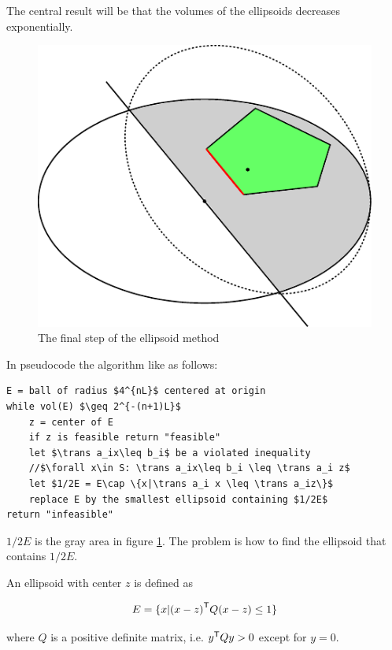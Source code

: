 The central result will be that the volumes of the ellipsoids decreases exponentially.

\begin{figure}[hbt]
\begin{center}
\includegraphics{./images/ellipsoid}
\end{center}
\caption{The final step of the ellipsoid method}
\label{Fig:ellipsoidMovement}
\end{figure}

In pseudocode the algorithm like as follows:

\begin{lstlisting}
E = ball of radius $4^{nL}$ centered at origin
while vol(E) $\geq 2^{-(n+1)L}$
	z = center of E
	if z is feasible return "feasible"
	let $\trans a_ix\leq b_i$ be a violated inequality
	//$\forall x\in S: \trans a_ix\leq b_i \leq \trans a_i z$
	let $1/2E = E\cap \{x|\trans a_i x \leq \trans a_iz\}$
	replace E by the smallest ellipsoid containing $1/2E$
return "infeasible"
\end{lstlisting}

$1/2E$ is the gray area in figure \ref{Fig:ellipsoidMovement}. The problem is how to find the ellipsoid that contains $1/2E$. 

\begin{Def}[Ellipsoid] An ellipsoid with center $z$ is defined as

\[E=\{x|{(x-z)}^\text{\upshape \sffamily T}Q(x-z)\leq 1\}\]

where $Q$ is a positive definite matrix, i.e. ${y}^\text{\upshape \sffamily T} Q y>0$ except for $y=0$.
\end{Def}

